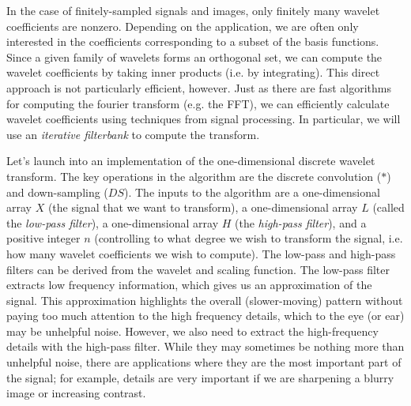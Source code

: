 In the case of finitely-sampled signals and images, only finitely many wavelet coefficients are nonzero.
Depending on the application, we are often only interested in the coefficients corresponding to a subset of the basis functions.
Since a given family of wavelets forms an orthogonal set, we can compute the wavelet coefficients
by taking inner products (i.e. by integrating). This direct approach is not particularly efficient,
however. Just as there are fast algorithms for computing the fourier transform (e.g. the FFT),
we can efficiently calculate wavelet coefficients using techniques from signal processing.
In particular, we will use an \emph{iterative filterbank} to compute the transform.

Let's launch into an implementation of the one-dimensional discrete wavelet transform.
The key operations in the algorithm are the discrete convolution ($*$) and down-sampling ($DS$).
The inputs to the algorithm are a one-dimensional array $X$ (the signal that we want to transform), a one-dimensional
array $L$ (called the \emph{low-pass filter}), a one-dimensional array $H$ (the \emph{high-pass filter}), and a positive
integer $n$ (controlling to what degree we wish to transform the signal, i.e. how many wavelet coefficients we wish to compute).
The low-pass and high-pass filters can be derived from the wavelet and scaling function.
The low-pass filter extracts low frequency information, which gives us an approximation of the signal.
This approximation highlights the overall (slower-moving) pattern
without paying too much attention to the high frequency details, which to the eye (or ear) may be unhelpful noise.
However, we also need to extract the high-frequency details with the high-pass filter. While they may sometimes be
nothing more than unhelpful noise, there are applications where they are the most important part of the signal; for example,
details are very important if we are sharpening a blurry image or increasing contrast.

